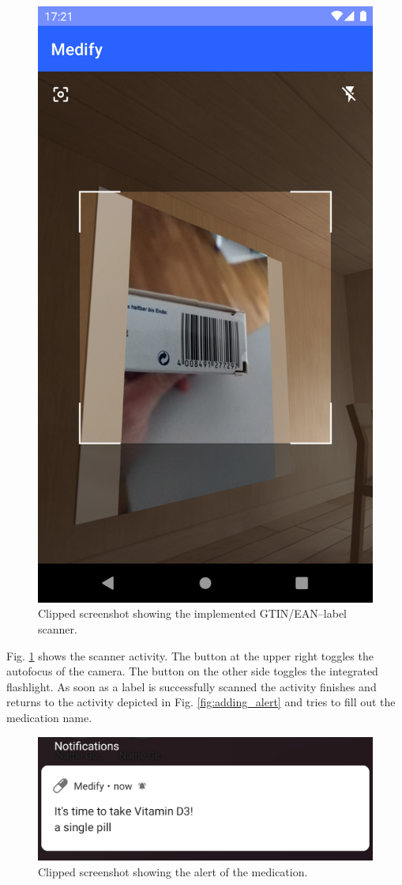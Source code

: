 \documentclass[conference]{IEEEtran}
\begin{document}
\begin{figure}[H]
	\centerline{\includegraphics[trim={0 400px 0 240px},clip,width=0.8\linewidth]{images/screenshots/barcode_scanning.png}}
	\caption{Clipped screenshot showing the implemented GTIN/EAN--label scanner.}
	\label{fig:barcode_scanning}
\end{figure}

Fig. \ref{fig:barcode_scanning} shows the scanner activity. The button at the upper right toggles the autofocus of
the camera. The button on the other side toggles the integrated flashlight. As soon as a label is successfully
scanned the activity finishes and returns to the activity depicted in Fig. \ref{fig:adding_alert} and tries to 
fill out the medication name.

\begin{figure}[H]
	\centerline{\includegraphics[width=0.8\linewidth]{images/screenshots/notification.png}}
	\caption{Clipped screenshot showing the alert of the medication.}
	\label{fig:notification}
\end{figure}
\end{document}

